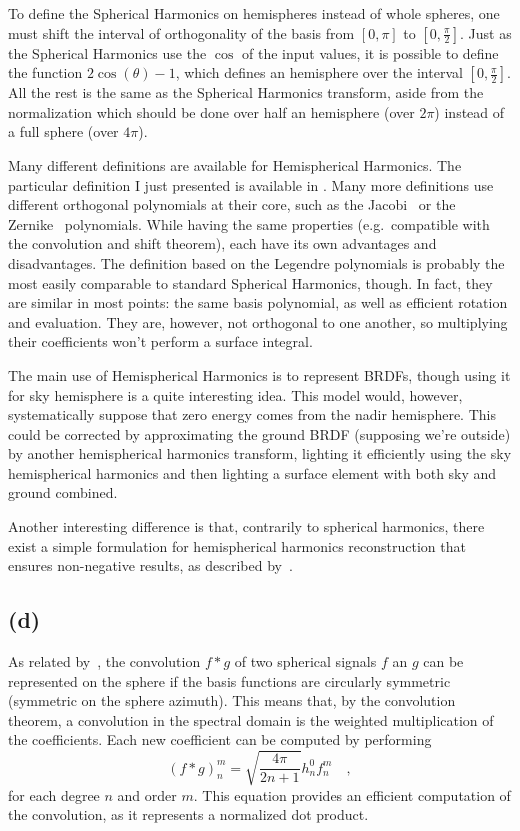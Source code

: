 \documentclass{report}
\begin{document}
To define the Spherical Harmonics on hemispheres instead of whole spheres, one must shift the interval of orthogonality of the basis from $\left[ 0, \pi \right]$ to $\left[ 0, \frac{\pi}{2} \right]$. Just as the Spherical Harmonics use the $\cos$ of the input values, it is possible to define the function $2\cos(\theta)-1$, which defines an hemisphere over the interval $\left[ 0, \frac{\pi}{2} \right]$. All the rest is the same as the Spherical Harmonics transform, aside from the normalization which should be done over half an hemisphere (over $2\pi$) instead of a full sphere (over $4\pi$).

Many different definitions are available for Hemispherical Harmonics. The particular definition I just presented is available in \cite{Gautron2004}. Many more definitions use different orthogonal polynomials at their core, such as the Jacobi~\cite{Makhotkin1996} or the Zernike~\cite{Koenderink1996} polynomials. While having the same properties (e.g.\ compatible with the convolution and shift theorem), each have its own advantages and disadvantages. The definition based on the Legendre polynomials is probably the most easily comparable to standard Spherical Harmonics, though. In fact, they are similar in most points: the same basis polynomial, as well as efficient rotation and evaluation. They are, however, not orthogonal to one another, so multiplying their coefficients won't perform a surface integral.

The main use of Hemispherical Harmonics is to represent BRDFs, though using it for sky hemisphere is a quite interesting idea. This model would, however, systematically suppose that zero energy comes from the nadir hemisphere. This could be corrected by approximating the ground BRDF (supposing we're outside) by another hemispherical harmonics transform, lighting it efficiently using the sky hemispherical harmonics and then lighting a surface element with both sky and ground combined.

Another interesting difference is that, contrarily to spherical harmonics, there exist a simple formulation for hemispherical harmonics reconstruction that ensures non-negative results, as described by~\cite{Elhabian2011}.

\subsection{(d)}
As related by~\cite{Sloan2008,jarosz-08}, the convolution $f*g$ of two spherical signals $f$ an $g$ can be represented on the sphere if the basis functions are circularly symmetric (symmetric on the sphere azimuth). This means that, by the convolution theorem, a convolution in the spectral domain is the weighted multiplication of the coefficients. Each new coefficient can be computed by performing
\begin{equation}
\left(f * g\right)_n^m = \sqrt{\frac{4\pi}{2n+1}} h_n^0 f_n^m
\quad,
\end{equation}
for each degree $n$ and order $m$. This equation provides an efficient computation of the convolution, as it represents a normalized dot product.
\end{document}
